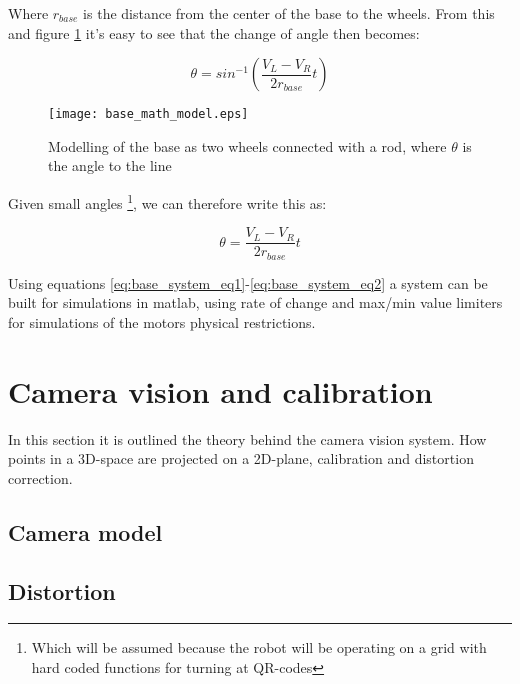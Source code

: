 \noindent Where $r_{base}$ is the distance from the center of the base to the wheels. From this and figure \ref{fig:base_math_model} it's easy to see that the change of angle then becomes:

\begin{equation}
    \theta = sin^{-1}\left(\frac{V_L-V_R}{2r_{base}}t\right)
\end{equation}

\begin{figure}[H]
    \centering
    \texttt{[image: base\_math\_model.eps]}
    \caption{Modelling of the base as two wheels connected with a rod, where $\theta$ is the angle to the line}
    \label{fig:base_math_model}
\end{figure}

Given small angles \footnote{Which will be assumed because the robot will be operating on a grid with hard coded functions for turning at QR-codes}, we can therefore write this as:

\begin{equation}
    \theta = \frac{V_L-V_R}{2r_{base}}t
\end{equation}


\noindent Using equations \eqref{eq:base_system_eq1}-\eqref{eq:base_system_eq2} a system can be built for simulations in matlab, using rate of change and max/min value limiters for simulations of the motors physical restrictions.



\section*{Camera vision and calibration}
In this section it is outlined the theory behind the camera vision system. 
How points in a 3D-space are projected on a 2D-plane, calibration and distortion correction. 
\subsection*{Camera model}
\subsection*{Distortion}
